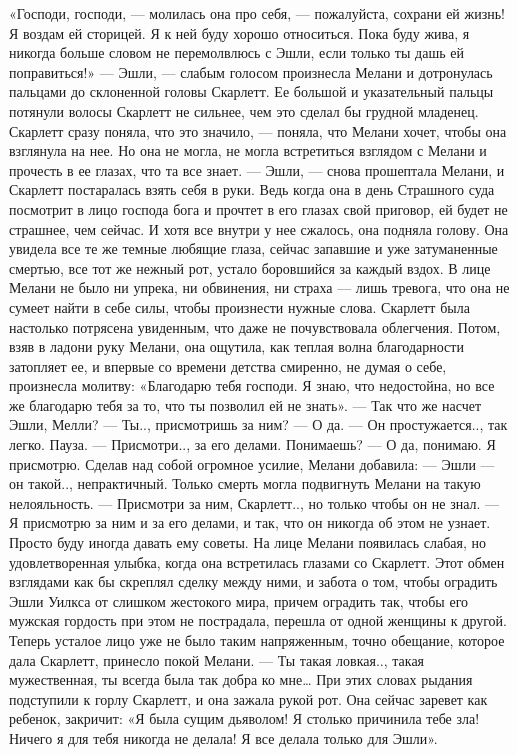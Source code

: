 «Господи, господи, — молилась она про себя, — пожалуйста, сохрани ей жизнь! Я воздам ей сторицей. Я к ней буду хорошо относиться. Пока буду жива, я никогда больше словом не перемолвлюсь с Эшли, если только ты дашь ей поправиться!» — Эшли, — слабым голосом произнесла Мелани и дотронулась пальцами до склоненной головы Скарлетт. Ее большой и указательный пальцы потянули волосы Скарлетт не сильнее, чем это сделал бы грудной младенец. Скарлетт сразу поняла, что это значило, — поняла, что Мелани хочет, чтобы она взглянула на нее. Но она не могла, не могла встретиться взглядом с Мелани и прочесть в ее глазах, что та все знает.
— Эшли, — снова прошептала Мелани, и Скарлетт постаралась взять себя в руки. Ведь когда она в день Страшного суда посмотрит в лицо господа бога и прочтет в его глазах свой приговор, ей будет не страшнее, чем сейчас. И хотя все внутри у нее сжалось, она подняла голову.
Она увидела все те же темные любящие глаза, сейчас запавшие и уже затуманенные смертью, все тот же нежный рот, устало боровшийся за каждый вздох. В лице Мелани не было ни упрека, ни обвинения, ни страха — лишь тревога, что она не сумеет найти в себе силы, чтобы произнести нужные слова.
Скарлетт была настолько потрясена увиденным, что даже не почувствовала облегчения. Потом, взяв в ладони руку Мелани, она ощутила, как теплая волна благодарности затопляет ее, и впервые со времени детства смиренно, не думая о себе, произнесла молитву:
«Благодарю тебя господи. Я знаю, что недостойна, но все же благодарю тебя за то, что ты позволил ей не знать».
— Так что же насчет Эшли, Мелли?
— Ты.., присмотришь за ним?
— О да.
— Он простужается.., так легко.
Пауза.
— Присмотри.., за его делами. Понимаешь?
— О да, понимаю. Я присмотрю.
Сделав над собой огромное усилие, Мелани добавила:
— Эшли — он такой.., непрактичный. Только смерть могла подвигнуть Мелани на такую нелояльность.
— Присмотри за ним, Скарлетт.., но только чтобы он не знал.
— Я присмотрю за ним и за его делами, и так, что он никогда об этом не узнает. Просто буду иногда давать ему советы.
На лице Мелани появилась слабая, но удовлетворенная улыбка, когда она встретилась глазами со Скарлетт. Этот обмен взглядами как бы скреплял сделку между ними, и забота о том, чтобы оградить Эшли Уилкса от слишком жестокого мира, причем оградить так, чтобы его мужская гордость при этом не пострадала, перешла от одной женщины к другой.
Теперь усталое лицо уже не было таким напряженным, точно обещание, которое дала Скарлетт, принесло покой Мелани.
— Ты такая ловкая.., такая мужественная, ты всегда была так добра ко мне…
При этих словах рыдания подступили к горлу Скарлетт, и она зажала рукой рот. Она сейчас заревет как ребенок, закричит: «Я была сущим дьяволом! Я столько причинила тебе зла! Ничего я для тебя никогда не делала! Я все делала только для Эшли».
